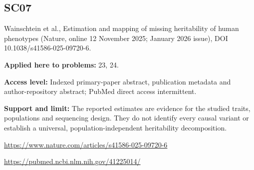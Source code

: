 \documentclass[11pt]{article}
\begin{document}
\subsection*{SC07}\label{check:SC07}

Wainschtein et al., Estimation and mapping of missing heritability of human phenotypes (Nature, online 12 November 2025; January 2026 issue), DOI 10.1038/s41586-025-09720-6.

\textbf{Applied here to problems:} 23, 24.

\textbf{Access level:} Indexed primary-paper abstract, publication metadata and author-repository abstract; PubMed direct access intermittent.

\textbf{Support and limit:} The reported estimates are evidence for the studied traits, populations and sequencing design. They do not identify every causal variant or establish a universal, population-independent heritability decomposition.

\url{https://www.nature.com/articles/s41586-025-09720-6}

\url{https://pubmed.ncbi.nlm.nih.gov/41225014/}
\end{document}
